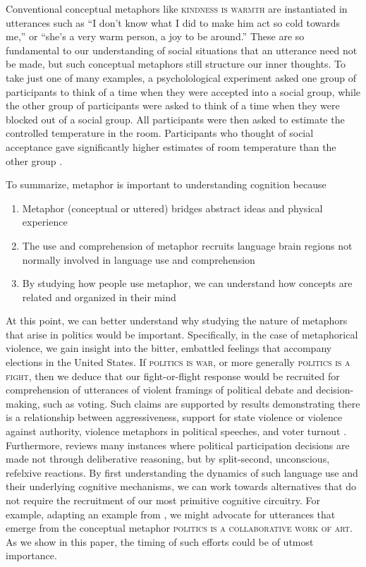 Conventional conceptual metaphors like \textsc{kindness is warmth} are instantiated
in utterances such as ``I don't know what I did to make him act so
cold towards me,'' or ``she's a very warm person, a joy to be around.'' 
These are so fundamental to our understanding of social situations that
an utterance need not be made, but such conceptual metaphors still structure
our inner thoughts.
To take just one of many examples, a psycholological 
experiment asked one group of participants to think of a time when they were
accepted into a social group, while the other group of participants were asked
to think of a time when they were blocked out of a social group. 
All participants were then asked to estimate the controlled 
temperature in the room.  Participants who thought of social acceptance
gave significantly higher estimates of room temperature than the other group
\cite{Lakoff2014, Zhong2008}.

To summarize, metaphor is important to understanding cognition because 
\begin{enumerate}
    \item Metaphor (conceptual or uttered) bridges abstract ideas and physical experience \cite{Jamrozik2015}
  \item The use and comprehension of metaphor recruits language brain regions not normally 
    involved in language use and comprehension
  \item By studying how people use metaphor, we can understand how concepts
    are related and organized in their mind
\end{enumerate}
At this point, we can better understand why studying the nature of metaphors
that arise in politics would be important. Specifically, in the case of
metaphorical violence, we gain insight into the bitter, embattled feelings
that accompany elections in the United States. If \textsc{politics is war},
or more generally \textsc{politics is a fight}, then we deduce that our
fight-or-flight response would be recruited for comprehension of utterances
of violent framings of political debate and decision-making, such as voting.
Such claims are supported by results demonstrating there is a relationship
between aggressiveness, support for state violence or violence against authority, 
violence metaphors in political speeches, and voter turnout \cite{Kalmoe2012}.
Furthermore,  reviews many instances where political
participation decisions are made not through deliberative reasoning, but by
split-second, unconscious, refelxive reactions.
By first understanding the dynamics of such language use and their underlying
cognitive mechanisms, we can work towards
alternatives that do not require the recruitment of our most primitive 
cognitive circuitry. 
For example, adapting an example from , we might
advocate for utterances that emerge from the conceptual metaphor
\textsc{politics is a collaborative work of art}. As we show in this paper,
the timing of such efforts could be of utmost importance.


